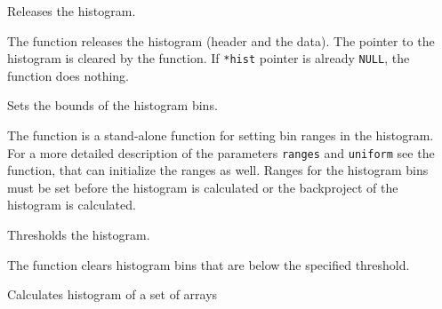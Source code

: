 \fi

\ifC
{}
Releases the histogram.


\begin{description}
\end{description}

The function releases the histogram (header and the data). The pointer to the histogram is cleared by the function. If \texttt{*hist} pointer is already \texttt{NULL}, the function does nothing.

Sets the bounds of the histogram bins.


\begin{description}
\end{description}

The function is a stand-alone function for setting bin ranges in the histogram. For a more detailed description of the parameters \texttt{ranges} and \texttt{uniform} see the  function, that can initialize the ranges as well. Ranges for the histogram bins must be set before the histogram is calculated or the backproject of the histogram is calculated.

\fi

Thresholds the histogram.


\begin{description}
\end{description}

The function clears histogram bins that are below the specified threshold.

\fi

\ifCpp

Calculates histogram of a set of arrays

